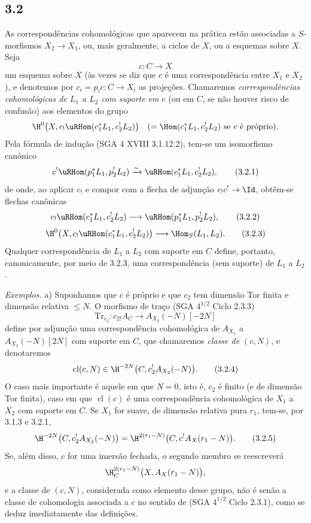 \subsection*{3.2}
As correspondências cohomológicas que aparecem na prática estão associadas a $S$-morfismos $X_2\to X_1$, ou, mais geralmente, a ciclos de $X$, ou a esquemas sobre $X$. Seja
\[
c:C\longrightarrow X
\]
um esquema sobre $X$ (às vezes se diz que $c$ é uma correspondência entre $X_1$ e $X_2$), e denotemos por $c_i=p_ic:C\to X_i$ as projeções. Chamaremos \emph{correspondências cohomológicas de $L_1$ a $L_2$ com suporte em $c$} (ou em $C$, se não houver risco de confusão) aos elementos do grupo
\[
\H^0\bigl(X,c_!\uRHom(c_1^*L_1,c_2^!L_2)\bigr)
\quad(=\Hom(c_1^*L_1,c_2^!L_2)\text{ se }c\text{ é próprio}).
\]
Pela fórmula de indução (SGA 4 XVIII 3.1.12.2), tem-se um isomorfismo canônico
\begin{equation}
c^!\uRHom(p_1^*L_1,p_2^!L_2)
\xrightarrow{\sim}
\uRHom(c_1^*L_1,c_2^!L_2),
\tag{3.2.1}
\end{equation}
de onde, ao aplicar $c_!$ e compor com a flecha de adjunção $c_!c^!\to \Id$, obtêm-se flechas canônicas
\begin{equation}
c_!\uRHom(c_1^*L_1,c_2^!L_2)
\longrightarrow
\uRHom(p_1^*L_1,p_2^!L_2),
\tag{3.2.2}
\end{equation}
\begin{equation}
\H^0\bigl(X,c_!\uRHom(c_1^*L_1,c_2^!L_2)\bigr)
\longrightarrow
\Hom_S(L_1,L_2).
\tag{3.2.3}
\end{equation}
Qualquer correspondência de $L_1$ a $L_2$ com suporte em $C$ define, portanto, canonicamente, por meio de 3.2.3, uma correspondência (sem suporte) de $L_1$ a $L_2$.

\emph{Exemplos.} a) Suponhamos que $c$ é próprio e que $c_2$ tem dimensão Tor finita e dimensão relativa $\leq N$. O morfismo de traço (SGA $4^{1/2}$ Ciclo 2.3.3)
\[
\mathrm{Tr}_{c_2}:c_{2!}A_C\longrightarrow A_{X_2}(-N)[-2N]
\]
define por adjunção uma correspondência cohomológica de $A_{X_1}$ a $A_{X_2}(-N)[2N]$ com suporte em $C$, que chamaremos \emph{classe de $(c,N)$}, e denotaremos
\begin{equation}
\operatorname{cl}(c,N)\in \H^{-2N}\bigl(C,c_2^!A_{X_2}(-N)\bigr).
\tag{3.2.4}
\end{equation}
O caso mais importante é aquele em que $N=0$, isto é, $c_2$ é finito (e de dimensão Tor finita), caso em que $\operatorname{cl}(c)$ é uma correspondência cohomológica de $X_1$ a $X_2$ com suporte em $C$. Se $X_1$ for suave, de dimensão relativa pura $r_1$, tem-se, por 3.1.3 e 3.2.1,
\begin{equation}
\H^{-2N}\bigl(C,c_2^!A_{X_2}(-N)\bigr)
=
\H^{2(r_1-N)}\bigl(C,c^!A_X(r_1-N)\bigr).
\tag{3.2.5}
\end{equation}
Se, além disso, $c$ for uma imersão fechada, o segundo membro se reescreverá
\[
\H^{2(r_1-N)}_C\bigl(X,A_X(r_1-N)\bigr),
\]
e a classe de $(c,N)$, considerada como elemento desse grupo, não é senão a classe de cohomologia associada a $c$ no sentido de (SGA $4^{1/2}$ Ciclo 2.3.1), como se deduz imediatamente das definições.

